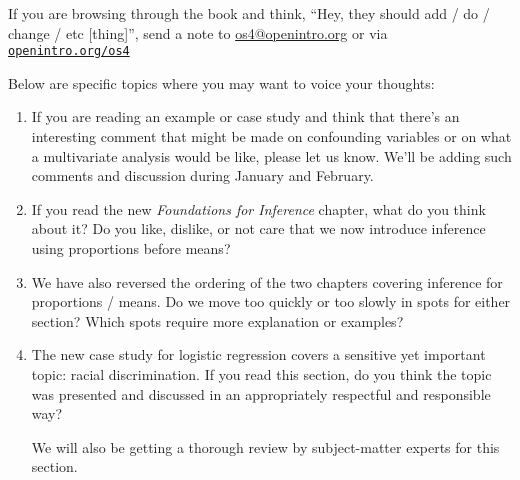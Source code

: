 \noindent%
If you are browsing through the book and think,
``Hey, they should add / do / change / etc [thing]'',
send a note to \url{os4@openintro.org}
or via
\href{http://www.openintro.org/os4}{\texttt{openintro.org/os4}}
\vspace{3mm}

\noindent%
Below are specific topics where you may
want to voice your thoughts:
\begin{enumerate}
\item
    If you are reading an example
    or case study and think that there's an
    interesting comment that might be made on
    confounding variables or on what a multivariate
    analysis would be like, please let us know.
    We'll be adding such comments and discussion
    during January and February.
\item
    If you read the new
    \emph{Foundations for Inference} chapter,
    what do you think about it?
    Do you like, dislike, or not care that we
    now introduce inference using proportions
    before means?
\item
    We have also reversed the ordering of the two chapters
    covering inference for proportions / means.
    Do we move too quickly or too slowly in spots
    for either section?
    Which spots require more explanation or examples?
\item
    The new case study for logistic regression
    covers a sensitive yet important topic:
    racial discrimination.
    If you read this section, do you think the
    topic was presented and discussed in an
    appropriately respectful and responsible way?

    We will also be getting a thorough
    review by subject-matter experts for this section.

\end{enumerate}


